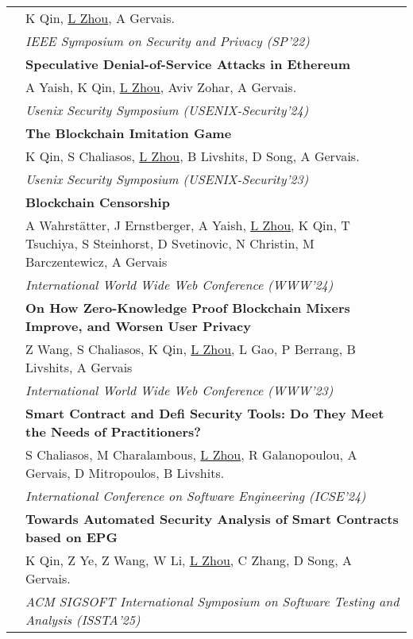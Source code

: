 \documentclass[letterpaper, 8pt]{article}
\newcommand{\corerankingAA}{\corebox{red}{30}{\xspace A* \xspace}\xspace}
\newcommand{\corerankingA}{\corebox{red}{15}{\xspace A \xspace}\xspace}
\newcommand{\tagSecurity}{\corebox{blue}{10}{Security}\xspace}
\newcommand{\tagPrivacy}{\corebox{green}{10}{Privacy}\xspace}
\newcommand{\tagSA}{\corebox{brown}{20}{System Analysis}\xspace}
\begin{document}
\begin{longtable}{p{0.5in}p{5.5in}}
& {\footnotesize K Qin, \underline{L Zhou}, A Gervais.} \\
& {\footnotesize \corerankingAA \textit{IEEE Symposium on Security and Privacy (SP'22)}}\\
& \textbf{Speculative Denial-of-Service Attacks in Ethereum} \tagSecurity \\
& {\footnotesize A Yaish, K Qin, \underline{L Zhou}, Aviv Zohar, A Gervais.} \\
& {\footnotesize \corerankingAA \textit{Usenix Security Symposium (USENIX-Security'24)}}\\
& \textbf{The Blockchain Imitation Game} \tagSecurity \tagSA \\
& {\footnotesize K Qin, S Chaliasos, \underline{L Zhou}, B Livshits, D Song, A Gervais.} \\
& {\footnotesize \corerankingAA \textit{Usenix Security Symposium (USENIX-Security'23)}}\\
& \textbf{Blockchain Censorship} \tagSecurity \\
& {\footnotesize A Wahrst\"atter, J Ernstberger, A Yaish, \underline{L Zhou}, K Qin, T Tsuchiya, S Steinhorst, D Svetinovic, N Christin, M Barczentewicz, A Gervais} \\
& {\footnotesize \corerankingAA \textit{International World Wide Web Conference (WWW'24)}} \\
& \textbf{On How Zero-Knowledge Proof Blockchain Mixers Improve, and Worsen User Privacy} \tagPrivacy \\
& {\footnotesize Z Wang, S Chaliasos, K Qin, \underline{L Zhou}, L Gao, P Berrang, B Livshits, A Gervais} \\
& {\footnotesize \corerankingAA \textit{International World Wide Web Conference (WWW'23)}} \\
& \textbf{Smart Contract and Defi Security Tools: Do They Meet the Needs of Practitioners?} \tagSecurity \\
& {\footnotesize S Chaliasos, M Charalambous, \underline{L Zhou}, R Galanopoulou, A Gervais, D Mitropoulos, B Livshits.}  \\
& {\footnotesize \corerankingAA \textit{International Conference on Software Engineering (ICSE'24)}} \\
& \textbf{Towards Automated Security Analysis of Smart Contracts based on EPG} \tagSecurity \\
& {\footnotesize K Qin, Z Ye, Z Wang, W Li, \underline{L Zhou}, C Zhang, D Song, A Gervais.} \\
& {\footnotesize \corerankingA \textit{ACM SIGSOFT International Symposium on Software Testing and Analysis (ISSTA'25)}}\\

\end{longtable}
\end{document}
